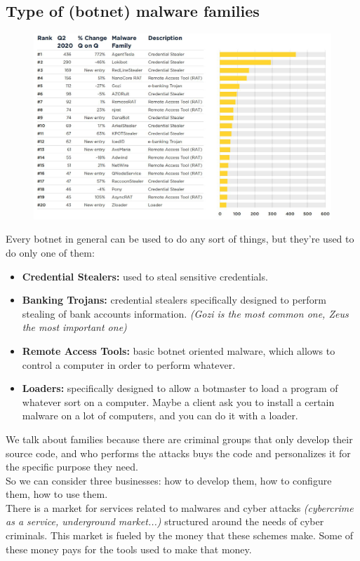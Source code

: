     \subsection{Type of (botnet) malware families}
        \begin{figure}[ht!]
            \centering
            \includegraphics[width=0.6\linewidth]{families.png}
        \end{figure}
        Every botnet in general can be used to do any sort of things, but they're used to do only one of them:
        \begin{itemize}
            \item \textbf{Credential Stealers:} used to steal sensitive credentials.
            \item \textbf{Banking Trojans:} credential stealers specifically designed to perform stealing of bank accounts information. \textit{(Gozi is the most common one, Zeus the most important one)}
            \item \textbf{Remote Access Tools:} basic botnet oriented malware, which allows to control a computer in order to perform whatever.
            \item \textbf{Loaders:} specifically designed to allow a botmaster to load a program of whatever sort on a computer. Maybe a client ask you to install a certain malware on a lot of computers, and you can do it with a loader.
        \end{itemize}
        We talk about families because there are criminal groups that only develop their source code, and who performs the attacks buys the code and personalizes it for the specific purpose they need.\\
        So we can consider three businesses: how to develop them, how to configure them, how to use them.\\
        There is a market for services related to malwares and cyber attacks \textit{(cybercrime as a service, underground market...)} structured around the needs of cyber criminals. This market is fueled by the money that these schemes make. Some of these money pays for the tools used to make that money.
\newpage
